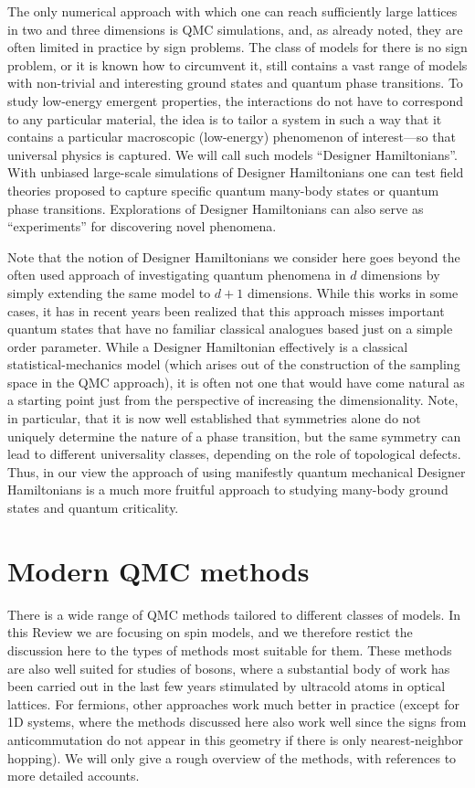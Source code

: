 \documentclass[aps,prb,groupedaddress,twocolumn]{revtex4}
\begin{document}
The only numerical approach with which one can reach sufficiently large lattices in two and three dimensions
is QMC simulations, and, as already noted, they are often limited in practice by sign problems. The class of
models for there is no sign problem, or it is known how to circumvent it, still contains a vast range of 
models with non-trivial and interesting ground states and quantum phase transitions. To study low-energy
emergent properties, the interactions do not have to correspond to any particular material, the idea is to tailor 
a system in such a way that it contains a particular macroscopic (low-energy) phenomenon of interest---so that
universal physics is captured. We will call such models ``Designer Hamiltonians''. With unbiased large-scale simulations 
of Designer Hamiltonians one can test field theories proposed to capture specific quantum many-body states or quantum phase 
transitions. Explorations of Designer Hamiltonians can also serve as ``experiments'' for discovering novel phenomena.

Note that the notion of Designer Hamiltonians we consider here goes beyond the often used approach of investigating
quantum phenomena in $d$ dimensions by simply extending the same model to $d+1$ dimensions. While this works in some cases,
it has in recent years been realized that this approach misses important quantum states that have no familiar classical
analogues based just on a simple order parameter. While a Designer Hamiltonian effectively is a classical statistical-mechanics
model (which arises out of the construction of the sampling space in the QMC approach), it is often not one that would
have come natural as a starting point just from the perspective of increasing the dimensionality. Note, in particular, that
it is now well established that symmetries alone do not uniquely determine the nature of a phase transition, but the
same symmetry can lead to different universality classes, depending on the role of topological defects. Thus, in our
view the approach of using manifestly quantum mechanical Designer Hamiltonians is a much more fruitful approach to
studying many-body ground states and quantum criticality.

\section{Modern QMC methods}

There is a wide range of QMC methods tailored to different classes of models. In this Review we are focusing on spin models, and we therefore 
restict the discussion here to the types of methods most suitable for them. These methods are also well suited for studies of bosons, where 
a substantial body of work has been carried out in the last few years stimulated by ultracold atoms in optical lattices. For fermions,
other approaches work much better in practice (except for 1D systems, where the methods discussed here also work well since the signs from
anticommutation do not appear in this geometry if there is only nearest-neighbor hopping). We will only give a rough overview of the methods,
with references to more detailed accounts.
\end{document}
